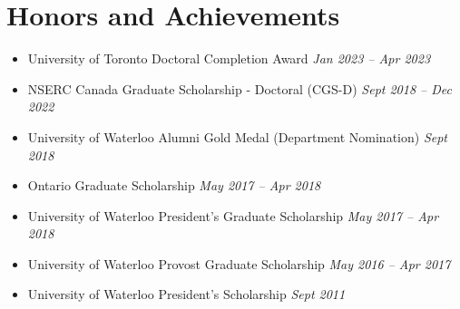 \section*{Honors and Achievements}
\vspace{\postsubhead}
\begin{adjustwidth}{\indentleft}{\indentright}
  \begin{itemize}
    \setlength\itemsep{0.2em}
    \item University of Toronto Doctoral Completion Award
    \hfill
    \textit{Jan 2023 -- Apr 2023}
    
    \item NSERC Canada Graduate Scholarship - Doctoral (CGS-D)
    \hfill
    \textit{Sept 2018 -- Dec 2022}
    
    \item University of Waterloo Alumni Gold Medal (Department Nomination)
    \hfill
    \textit{Sept 2018}
    
    \item Ontario Graduate Scholarship
    \hfill
    \textit{May 2017 -- Apr 2018}
    
    \item University of Waterloo President's Graduate Scholarship
    \hfill
    \textit{May 2017 -- Apr 2018}
    
    \item University of Waterloo Provost Graduate Scholarship
    \hfill
    \textit{May 2016 -- Apr 2017}
    
    \item University of Waterloo President's Scholarship
    \hfill
    \textit{Sept 2011}
    
    
    
    
  \end{itemize}
\end{adjustwidth}
